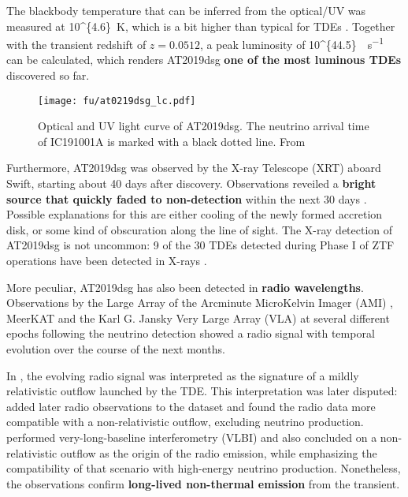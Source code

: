 The blackbody temperature that can be inferred from the optical/UV was measured at \SI[parse-numbers = false]{10^{4.6}}{\K}, which is a bit higher than typical for TDEs . Together with the transient redshift of $z=0.0512$, a peak luminosity of \SI[parse-numbers = false]{10^{44.5}}{\erg\per\s} can be calculated, which renders AT2019dsg \textbf{one of the most luminous TDEs} discovered so far.


\begin{figure*}[htb]
    \texttt{[image: fu/at0219dsg\_lc.pdf]}
    \caption[AT2019dsg optical/UV light curve]{Optical and UV light curve of AT2019dsg. The neutrino arrival time of IC191001A is marked with a black dotted line. From \cite{Stein2021}}
\end{figure*}

Furthermore, AT2019dsg was observed by the X-ray Telescope (XRT)  aboard Swift, starting about 40 days after discovery. Observations reveiled a \textbf{bright source that quickly faded to non-detection} within the next 30 days \cite{Stein2021}. Possible explanations for this are either cooling of the newly formed accretion disk, or some kind of obscuration along the line of sight. The X-ray detection of AT2019dsg is not uncommon: 9 of the 30 TDEs detected during Phase I of ZTF operations have been detected in X-rays .

More peculiar, AT2019dsg has also been detected in \textbf{radio wavelengths}. Observations by the Large Array of the Arcminute MicroKelvin Imager (AMI) , MeerKAT  and the Karl G. Jansky Very Large Array (VLA)  at several different epochs following the neutrino detection showed a radio signal with temporal evolution over the course of the next months.

In \cite{Stein2021}, the evolving radio signal was interpreted as the signature of a mildly relativistic outflow launched by the TDE. This interpretation was later disputed:  added later radio observations to the dataset and found the radio data more compatible with a non-relativistic outflow, excluding neutrino production.  performed very-long-baseline interferometry (VLBI) and also concluded on a non-relativistic outflow as the origin of the radio emission, while emphasizing the compatibility of that scenario with high-energy neutrino production. Nonetheless, the observations confirm \textbf{long-lived non-thermal emission} from the transient.

